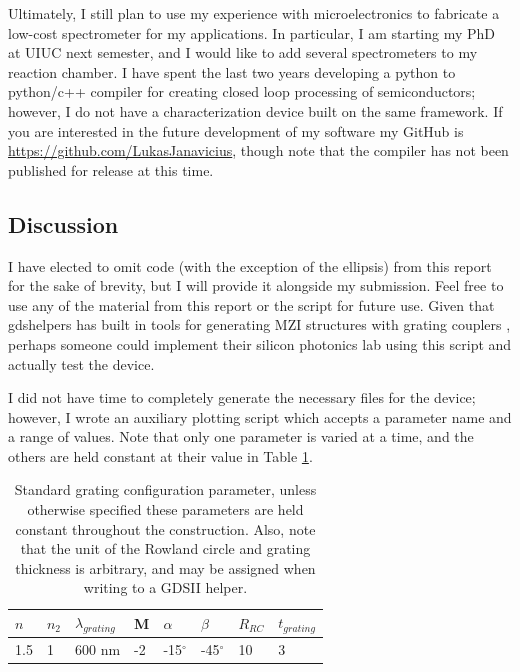 \documentclass{article}
\begin{document}
    Ultimately, I still plan to use my experience with microelectronics to fabricate a low-cost spectrometer for my applications. In particular, I am starting my PhD at UIUC next semester, and I would like to add several spectrometers to my reaction chamber. I have spent the last two years developing a python to python/c++ compiler for creating closed loop processing of semiconductors; however, I do not have a characterization device built on the same framework. If you are interested in the future development of my software my GitHub is \url{https://github.com/LukasJanavicius}, though note that the compiler has not been published for release at this time. 


    \subsection{Discussion}
    I have elected to omit code (with the exception of the ellipsis) from this report for the sake of brevity, but I will provide it alongside my submission. Feel free to use any of the material from this report or the script for future use. Given that gdshelpers has built in tools for generating MZI structures with grating couplers \cite{WelcomeDocumentation}, perhaps someone could implement their silicon photonics lab using this script and actually test the device. 
    
    I did not have time to completely generate the necessary files for the device; however, I wrote an auxiliary plotting script which accepts a parameter name and a range of values. Note that only one parameter is varied at a time, and the others are held constant at their value in Table \ref{tab:std_param}.
    
    \begin{table}[H]
    \centering
    \caption{Standard grating configuration parameter, unless otherwise specified these parameters are held constant throughout the construction. Also, note that the unit of the Rowland circle and grating thickness is arbitrary, and may be assigned when writing to a GDSII helper.}
    \label{tab:std_param}
    \begin{tabular}{|l|l|l|l|l|l|l|l|}
    \hline
    $n$ & $n_2$ & $\lambda_{grating}$ & M  & $\alpha$      & $\beta$       & $R_{RC}$ & $t_{grating}$ \\ \hline
    1.5 & 1     & 600 nm              & -2 & -15$^{\circ}$ & -45$^{\circ}$ & 10       & 3             \\ \hline
    \end{tabular}
    \end{table}
    
\end{document}

